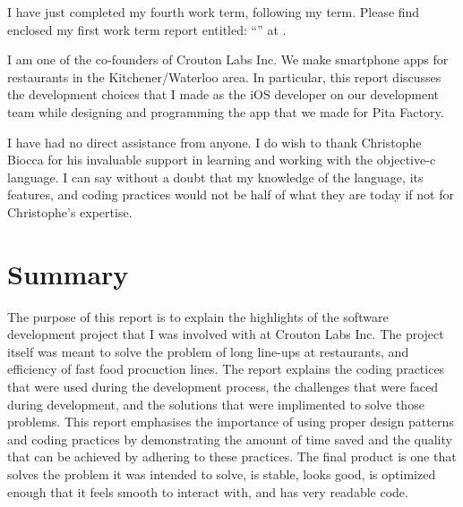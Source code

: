 \documentclass[se]{uw-wkrpt}
\begin{document}
\begin{letter}
I have just completed my fourth work term, following my \theterm{} term.
Please find enclosed my first work term report entitled:
``\thetitle'' at \theemployer.  

I am one of the co-founders of Crouton Labs Inc. We make smartphone
apps for restaurants in the Kitchener/Waterloo area. In particular, this
report discusses the development choices that I made as the iOS developer
on our development team while designing and programming the app that we
made for Pita Factory.

I have had no direct assistance from anyone.  I do wish to thank Christophe
Biocca for his invaluable support in learning and working with the objective-c
language. I can say without a doubt that my knowledge of the language, its features,
and coding practices would not be half of what they are today if not for Christophe's
expertise.

\end{letter}

\tableofcontents
\listoffigures

\section{Summary}


The purpose of this report is to explain the highlights of the software development
project that I was involved with at Crouton Labs Inc. The project itself was meant
to solve the problem of long line-ups at restaurants, and efficiency of fast food
procuction lines. The report explains the coding
practices that were used during the development process, the challenges that were faced
during development, and the solutions that were implimented to solve those problems.
This report emphasises the importance of using proper design patterns and coding practices
by demonstrating the amount of time saved and the quality that can be achieved by 
adhering to these practices. The final product is one that solves the problem it was
intended to solve, is stable, looks good,
is optimized enough that it feels smooth to interact with, and has very readable code.
\end{document}
